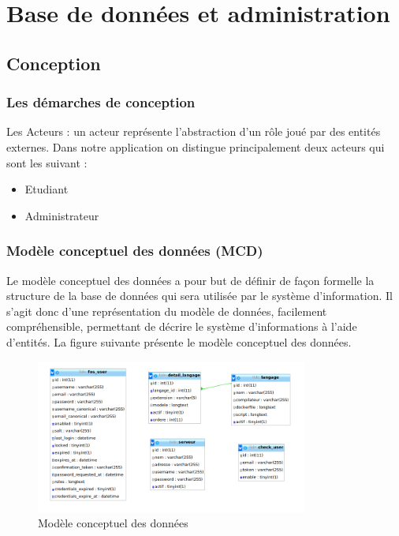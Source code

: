 \chapter{Base de données et administration}
\label{ch-bdd-admin}


\section{Conception}

\subsection{Les démarches de conception}

\par Les Acteurs : un acteur représente l’abstraction d’un rôle joué par des entités externes. Dans notre application on distingue principalement deux acteurs qui sont les suivant :

\begin{itemize}
\item Etudiant 
\item Administrateur
\end{itemize}

\subsection{Modèle conceptuel des données (MCD)}
 
\par Le modèle conceptuel des données a pour but de définir de façon formelle la structure de la base de données qui sera utilisée par le système d'information. Il s'agit donc d'une représentation du modèle de données, facilement compréhensible, permettant de décrire le système d'informations à l'aide d'entités. 
La figure suivante présente le modèle conceptuel des données.

\begin{figure}[H]
\centering
\includegraphics[width=0.8\textwidth]{./img/BDD.png}
\caption{Modèle conceptuel des données}
\end{figure}

